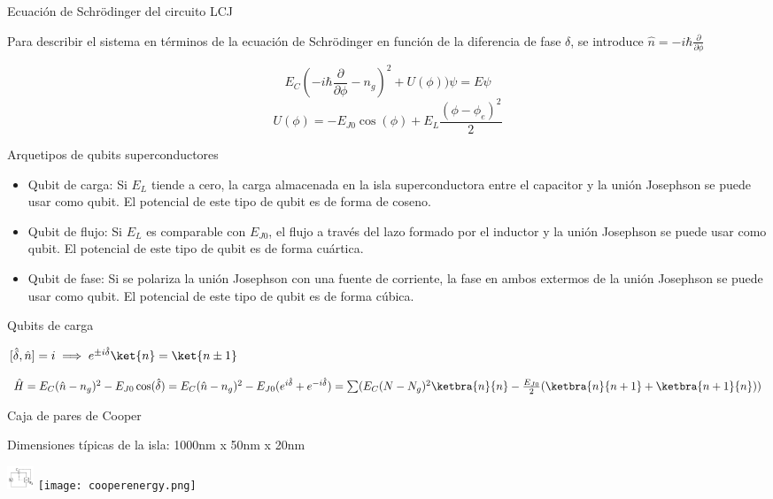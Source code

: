 \begin{frame}{Ecuación de Schrödinger del circuito LCJ}
\protect\hypertarget{ecuaciuxf3n-de-schruxf6dinger-del-circuito-lcj}{}

Para describir el sistema en términos de la ecuación de Schrödinger en
función de la diferencia de fase \(\delta\), se introduce
\(\hat{n}=-i\hbar \frac{\partial}{\partial \phi}\)

\[E_C (-i\hbar \frac{\partial}{\partial\phi}-n_g)^2+U(\phi))\psi = E \psi\]
\[U(\phi) = -E_{J0} \cos(\phi)+E_L \frac{(\phi-\phi_e)^2}{2}\]

\end{frame}

\begin{frame}{Arquetipos de qubits superconductores}
\protect\hypertarget{arquetipos-de-qubits-superconductores}{}

\begin{itemize}
\item
  Qubit de carga: Si \(E_L\) tiende a cero, la carga almacenada en la
  isla superconductora entre el capacitor y la unión Josephson se puede
  usar como qubit. El potencial de este tipo de qubit es de forma de
  coseno.
\item
  Qubit de flujo: Si \(E_L\) es comparable con \(E_{J0}\), el flujo a
  través del lazo formado por el inductor y la unión Josephson se puede
  usar como qubit. El potencial de este tipo de qubit es de forma
  cuártica.
\item
  Qubit de fase: Si se polariza la unión Josephson con una fuente de
  corriente, la fase en ambos extermos de la unión Josephson se puede
  usar como qubit. El potencial de este tipo de qubit es de forma
  cúbica.
\end{itemize}

\end{frame}

\begin{frame}{Qubits de carga}
\protect\hypertarget{qubits-de-carga}{}

\([\hat{\delta},\hat{n}]=i \implies e^{\pm i \hat{\delta}} \ket{n} = \ket{n\pm 1}\)

\(\hat{H} = E_C (\hat{n}-n_g)^2 - E_{J0} \cos(\hat{\delta}) =  E_C (\hat{n}-n_g)^2 - E_{J0} (e^{i \hat{\delta}} + e^{-i \hat{\delta}}) =  \sum(E_C(N-N_g)^2 \ketbra{n}{n} - \frac{E_{J0}}{2}(\ketbra{n}{n+1}+\ketbra{n+1}{n}))\)

\end{frame}

\begin{frame}{Caja de pares de Cooper}
\protect\hypertarget{caja-de-pares-de-cooper}{}

Dimensiones típicas de la isla: 1000nm x 50nm x 20nm

\includegraphics[width=0.3125in,height=\textheight]{Avance1/cooperpairbox.png}
\texttt{[image: cooperenergy.png]}

\end{frame}

